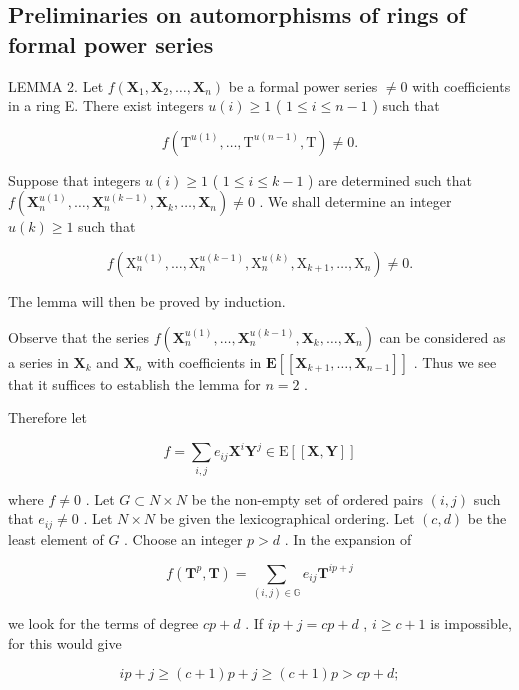 \subsection{Preliminaries on automorphisms of rings of formal power series}

LEMMA 2. Let \(f(\mathbf{X}_1, \mathbf{X}_2, \ldots, \mathbf{X}_n)\) be a formal power series \(\neq 0\) with coefficients in a ring E. There exist integers \(u(i) \geqslant 1\) ( \(1 \leqslant i \leqslant n - 1\) ) such that

\[
f (\mathrm{T} ^ {u (1)}, \dots , \mathrm{T} ^ {u (n - 1)}, \mathrm{T}) \neq 0.
\]

Suppose that integers \(u(i) \geqslant 1\) ( \(1 \leqslant i \leqslant k - 1\) ) are determined such that \(f(\mathbf{X}_n^{u(1)}, \ldots, \mathbf{X}_n^{u(k-1)}, \mathbf{X}_k, \ldots, \mathbf{X}_n) \neq 0\) . We shall determine an integer \(u(k) \geqslant 1\) such that

\[
f \left(\mathrm{X} _ {n} ^ {u (1)}, \dots , \mathrm{X} _ {n} ^ {u (k - 1)}, \mathrm{X} _ {n} ^ {u (k)}, \mathrm{X} _ {k + 1}, \dots , \mathrm{X} _ {n}\right) \neq 0.
\]

The lemma will then be proved by induction.

Observe that the series \(f(\mathbf{X}_n^{u(1)}, \ldots, \mathbf{X}_n^{u(k-1)}, \mathbf{X}_k, \ldots, \mathbf{X}_n)\) can be considered as a series in \(\mathbf{X}_k\) and \(\mathbf{X}_n\) with coefficients in \(\mathbf{E}[[\mathbf{X}_{k+1}, \ldots, \mathbf{X}_{n-1}]]\) . Thus we see that it suffices to establish the lemma for \(n = 2\) .

Therefore let

\[
f = \sum_ {i, j} e _ {i j} \mathbf {X} ^ {i} \mathbf {Y} ^ {j} \in \mathrm{E} [ [ \mathbf {X}, \mathbf {Y} ] ]
\]

where \(f \neq 0\) . Let \(G \subset N \times N\) be the non-empty set of ordered pairs \((i, j)\) such that \(e_{ij} \neq 0\) . Let \(N \times N\) be given the lexicographical ordering. Let \((c, d)\) be the least element of \(G\) . Choose an integer \(p > d\) . In the expansion of

\[
f (\mathbf {T} ^ {p}, \mathbf {T}) = \sum_ {(i, j) \in \mathbb {G}} e _ {i j} \mathbf {T} ^ {i p + j}
\]

we look for the terms of degree \(cp + d\) . If \(ip + j = cp + d\) , \(i \geqslant c + 1\) is impossible, for this would give

\[
i p + j \geqslant (c + 1) p + j \geqslant (c + 1) p > c p + d;
\]

